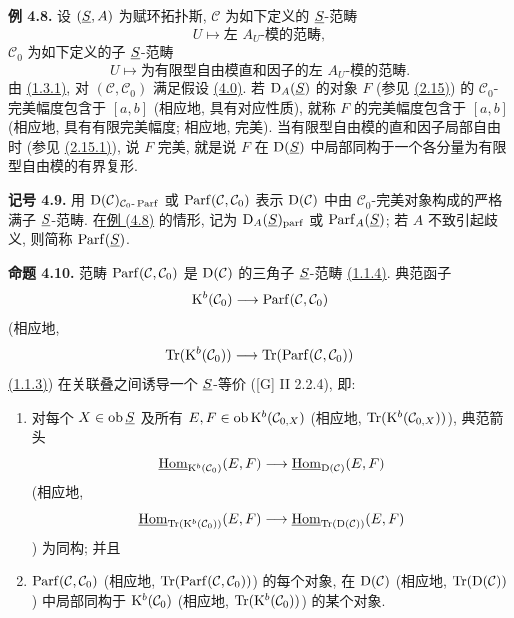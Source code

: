 \textbf{例 4.8.} 设 \((\underline S,A)\) 为赋环拓扑斯, \(\mathcal C\) 为如下定义的 \(\underline S\)-范畴
\[
  U\longmapsto \text{左 }A_U\text{-模的范畴},
\]
\(\mathcal C_0\) 为如下定义的子 \(\underline S\)-范畴
\[
  U\longmapsto \text{为有限型自由模直和因子的左 }A_U\text{-模的范畴}.
\]
由 \hyperlink{sga6.e01.lem.1-3-1}{(1.3.1)}, 对 \((\mathcal C,\mathcal C_0)\) 满足假设 \hyperlink{sga6.e01.para.4-0}{(4.0)}. 若 \(\mathrm D_A(\underline S)\) 的对象 \(F\) (参见 \hyperlink{sga6.e01.ex.2-15}{(2.15)}) 的 \(\mathcal C_0\)-完美幅度包含于 \([a,b]\) (相应地, 具有对应性质), 就称 \(F\) 的完美幅度包含于 \([a,b]\) (相应地, 具有有限完美幅度; 相应地, 完美). 当有限型自由模的直和因子局部自由时 (参见 \hyperlink{sga6.e01.lem.2-15-1}{(2.15.1)}), 说 \(F\) 完美, 就是说 \(F\) 在 \(\mathrm D(\underline S)\) 中局部同构于一个各分量为有限型自由模的有界复形.

\textbf{记号 4.9.} 用 \(\mathrm D(\mathcal C)_{\mathcal C_0\text{-}\operatorname{Parf}}\) 或 \(\operatorname{Parf}(\mathcal C,\mathcal C_0)\) 表示 \(\mathrm D(\mathcal C)\) 中由 \(\mathcal C_0\)-完美对象构成的严格满子 \(\underline S\)-范畴. 在\hyperlink{sga6.e01.ex.4-8}{例 (4.8)} 的情形, 记为 \(\mathrm D_A(\underline S)_{\mathrm{parf}}\) 或 \(\operatorname{Parf}_A(\underline S)\); 若 \(A\) 不致引起歧义, 则简称 \(\operatorname{Parf}(\underline S)\).

\textbf{命题 4.10.} 范畴 \(\operatorname{Parf}(\mathcal C,\mathcal C_0)\) 是 \(\mathrm D(\mathcal C)\) 的三角子 \(\underline S\)-范畴 \hyperlink{sga6.e01.para.1-1-4}{(1.1.4)}. 典范函子
\[
  \mathrm K^b(\mathcal C_0)\longrightarrow \operatorname{Parf}(\mathcal C,\mathcal C_0)
\]
(相应地,
\[
  \operatorname{Tr}(\mathrm K^b(\mathcal C_0))\longrightarrow \operatorname{Tr}(\operatorname{Parf}(\mathcal C,\mathcal C_0))
\]
\hyperlink{sga6.e01.para.1-1-3}{(1.1.3)}) 在关联叠之间诱导一个 \(\underline S\)-等价 ([G] II 2.2.4), 即:

\begin{enumerate}[label=(\roman*)]
\item 对每个 \(X\in\operatorname{ob}\underline S\) 及所有 \(E,F\in\operatorname{ob}\mathrm K^b(\mathcal C_{0,X})\) (相应地, \(\operatorname{Tr}(\mathrm K^b(\mathcal C_{0,X}))\)), 典范箭头
\[
  \underline{\operatorname{Hom}}_{\mathrm K^b(\mathcal C_0)}(E,F)
  \longrightarrow
  \underline{\operatorname{Hom}}_{\mathrm D(\mathcal C)}(E,F)
\]
(相应地,
\[
  \underline{\operatorname{Hom}}_{\operatorname{Tr}(\mathrm K^b(\mathcal C_0))}(E,F)
  \longrightarrow
  \underline{\operatorname{Hom}}_{\operatorname{Tr}(\mathrm D(\mathcal C))}(E,F)
\]) 为同构; 并且
\item \(\operatorname{Parf}(\mathcal C,\mathcal C_0)\) (相应地, \(\operatorname{Tr}(\operatorname{Parf}(\mathcal C,\mathcal C_0))\)) 的每个对象, 在 \(\mathrm D(\mathcal C)\) (相应地, \(\operatorname{Tr}(\mathrm D(\mathcal C))\)) 中局部同构于 \(\mathrm K^b(\mathcal C_0)\) (相应地, \(\operatorname{Tr}(\mathrm K^b(\mathcal C_0))\)) 的某个对象.
\end{enumerate}

